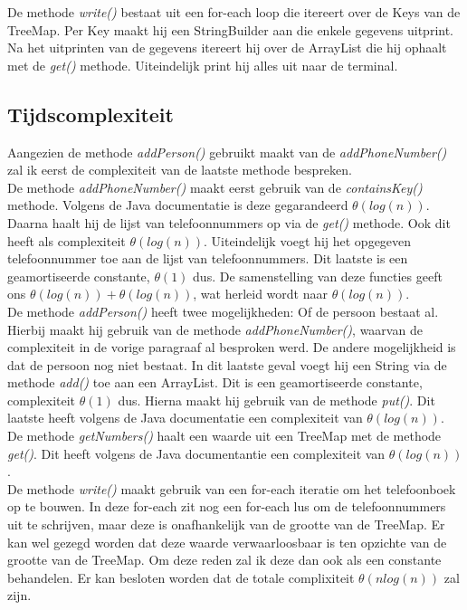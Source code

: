 \documentclass[10pt,a4paper]{report}
\begin{document}
De methode \textsl{write()} bestaat uit een for-each loop die itereert over de Keys van de TreeMap. Per Key maakt hij een StringBuilder aan die enkele gegevens uitprint. Na het uitprinten van de gegevens itereert hij over de ArrayList die hij ophaalt met de \textsl{get()} methode. Uiteindelijk print hij alles uit naar de terminal.

\subsection*{Tijdscomplexiteit}
Aangezien de methode \textsl{addPerson()} gebruikt maakt van de \textsl{addPhoneNumber()} zal ik eerst de complexiteit van de laatste methode bespreken.\\
De methode \textsl{addPhoneNumber()} maakt eerst gebruik van de \textsl{containsKey()} methode. Volgens de Java documentatie is deze gegarandeerd $\theta(log(n))$. Daarna haalt hij de lijst van telefoonnummers op via de \textsl{get()} methode. Ook dit heeft als complexiteit $\theta(log(n))$. Uiteindelijk voegt hij het opgegeven telefoonnummer toe aan de lijst van telefoonnummers. Dit laatste is een geamortiseerde constante, $\theta(1)$ dus. De samenstelling van deze functies geeft ons $\theta(log(n))+\theta(log(n))$, wat herleid wordt naar $\theta(log(n))$.\\

De methode \textsl{addPerson()} heeft twee mogelijkheden: Of de persoon bestaat al. Hierbij maakt hij gebruik van de methode \textsl{addPhoneNumber()}, waarvan de complexiteit in de vorige paragraaf al besproken werd. De andere mogelijkheid is dat de persoon nog niet bestaat. In dit laatste geval voegt hij een String via de methode \textsl{add()} toe aan een ArrayList. Dit is een geamortiseerde constante, complexiteit $\theta(1)$ dus. Hierna maakt hij gebruik van de methode \textsl{put()}. Dit laatste heeft volgens de Java documentatie een complexiteit van $\theta(log(n))$.\\

De methode \textsl{getNumbers()} haalt een waarde uit een TreeMap met de methode \textsl{get()}. Dit heeft volgens de Java documentantie een complexiteit van $\theta(log(n))$.\\

De methode \textsl{write()} maakt gebruik van een for-each iteratie om het telefoonboek op te bouwen. In deze for-each zit nog een for-each lus om de telefoonnummers uit te schrijven, maar deze is onafhankelijk van de grootte van de TreeMap. Er kan wel gezegd worden dat deze waarde verwaarloosbaar is ten opzichte van de grootte van de TreeMap. Om deze reden zal ik deze dan ook als een constante behandelen. Er kan besloten worden dat de totale complixiteit $\theta(nlog(n))$ zal zijn.
\end{document}
